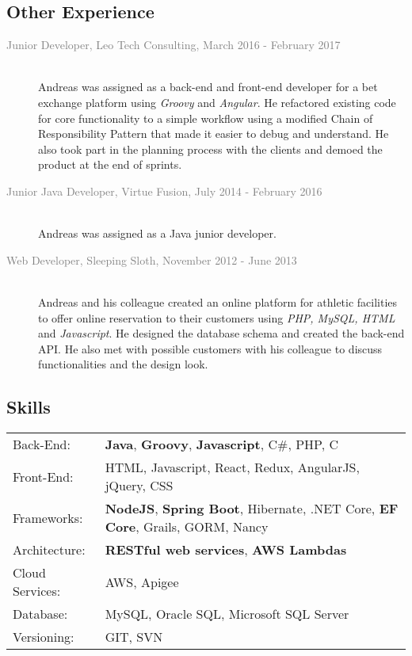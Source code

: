 \documentclass[12pt]{report}
\begin{document}
    \subsection*{Other Experience}
      \begin{description}
        \item[\textcolor{gray}{Junior Developer, Leo Tech Consulting, March 2016 - February 2017}]\textcolor{white}{.}\\
        Andreas was assigned as a back-end and front-end developer for a bet exchange platform using \textit{Groovy} and \textit{Angular}. He refactored existing code for core functionality to a simple workflow using a modified Chain of Responsibility Pattern that made it easier to debug and understand. He also took part in the planning process with the clients and demoed the product at the end of sprints.
      \end{description}

      \begin{description}
        \item[\textcolor{gray}{Junior Java Developer, Virtue Fusion, July 2014 - February 2016}]\textcolor{white}{.}\\
        Andreas was assigned as a Java junior developer.
      \end{description}


      \begin{description}
        \item[\textcolor{gray}{Web Developer, Sleeping Sloth, November 2012 - June 2013}]\textcolor{white}{.}\\
        Andreas and his colleague created an online platform for athletic facilities to offer online reservation to their customers using \textit{PHP, MySQL, HTML} and \textit{Javascript}. He designed the database schema and created the back-end API. He also met with possible customers with his colleague to discuss functionalities and the design look.
      \end{description}
    
    \subsection*{Skills}
      \begin{tabular}{>{}l>{}p{12cm}} 
        Back-End:			  &	\textbf{Java}, \textbf{Groovy}, \textbf{Javascript}, C\#, PHP, C\\ 
        Front-End:			&	HTML, Javascript, React, Redux, AngularJS, jQuery, CSS\\ 
        Frameworks:		  &	\textbf{NodeJS}, \textbf{Spring Boot}, Hibernate, .NET Core, \textbf{EF Core}, Grails, GORM, Nancy\\
        Architecture:	  &	\textbf{RESTful web services}, \textbf{AWS Lambdas}\\ 
        Cloud Services: &	AWS, Apigee\\
        Database:			  &	MySQL, Oracle SQL, Microsoft SQL Server\\ 
        Versioning:		  &	GIT, SVN\\ 
      \end{tabular}
\end{document}
